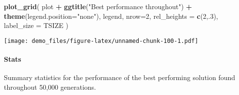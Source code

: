 \documentclass[]{book}
\newenvironment{Shaded}{\begin{snugshade}}{\end{snugshade}}
\newcommand{\DataTypeTok}[1]{\textcolor[rgb]{0.13,0.29,0.53}{#1}}
\newcommand{\DecValTok}[1]{\textcolor[rgb]{0.00,0.00,0.81}{#1}}
\newcommand{\KeywordTok}[1]{\textcolor[rgb]{0.13,0.29,0.53}{\textbf{#1}}}
\newcommand{\NormalTok}[1]{#1}
\newcommand{\OperatorTok}[1]{\textcolor[rgb]{0.81,0.36,0.00}{\textbf{#1}}}
\newcommand{\OtherTok}[1]{\textcolor[rgb]{0.56,0.35,0.01}{#1}}
\newcommand{\StringTok}[1]{\textcolor[rgb]{0.31,0.60,0.02}{#1}}
\let\oldparagraph\paragraph
\renewcommand{\paragraph}[1]{\oldparagraph{#1}\mbox{}}
\begin{document}
\begin{Shaded}
\begin{Highlighting}[]
\KeywordTok{plot_grid}\NormalTok{(}
\NormalTok{  plot }\OperatorTok{+}
\StringTok{    }\KeywordTok{ggtitle}\NormalTok{(}\StringTok{"Best performance throughout"}\NormalTok{) }\OperatorTok{+}
\StringTok{    }\KeywordTok{theme}\NormalTok{(}\DataTypeTok{legend.position=}\StringTok{"none"}\NormalTok{),}
\NormalTok{  legend,}
  \DataTypeTok{nrow=}\DecValTok{2}\NormalTok{,}
  \DataTypeTok{rel_heights =} \KeywordTok{c}\NormalTok{(}\DecValTok{2}\NormalTok{,.}\DecValTok{3}\NormalTok{),}
  \DataTypeTok{label_size =}\NormalTok{ TSIZE}
\NormalTok{)}
\end{Highlighting}
\end{Shaded}

\texttt{[image: demo\_files/figure-latex/unnamed-chunk-100-1.pdf]}

\hypertarget{stats-18}{%
\paragraph{Stats}\label{stats-18}}

Summary statistics for the performance of the best performing solution found throughout 50,000 generations.

\begin{Shaded}
\end{Shaded}
\end{document}
